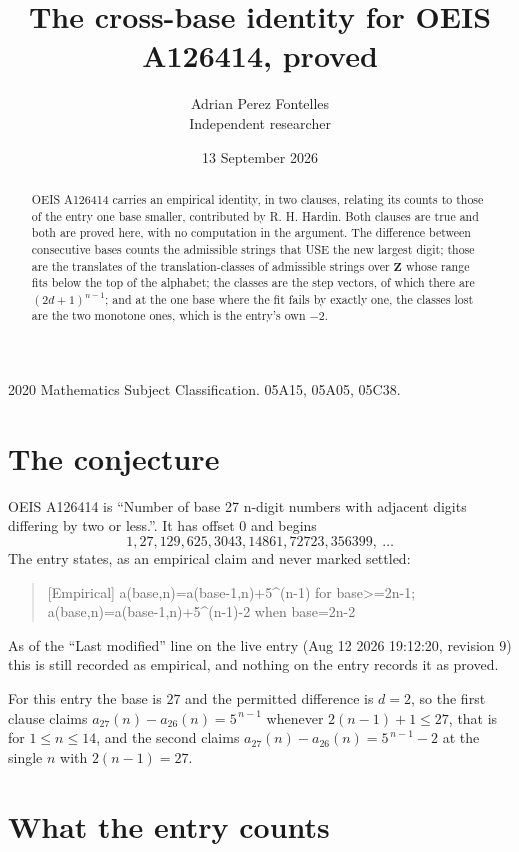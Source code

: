 \documentclass[11pt,a4paper]{article}
\title{The cross-base identity for OEIS A126414, proved}
\author{Adrian Perez Fontelles\\ \small Independent researcher}
\date{13 September 2026}
\theoremstyle{plain}
\theoremstyle{definition}
\begin{document}
\maketitle

\begin{abstract}
OEIS A126414 carries an empirical identity, in two clauses, relating its counts to those of the
entry one base smaller, contributed by R. H. Hardin. Both clauses are true and both are proved
here, with no computation in the argument. The difference between consecutive bases counts the
admissible strings that USE the new largest digit; those are the translates of the
translation-classes of admissible strings over $\mathbf{Z}$ whose range fits below the top of
the alphabet; the classes are the step vectors, of which there are $(2d+1)^{n-1}$; and at the
one base where the fit fails by exactly one, the classes lost are the two monotone ones, which
is the entry's own $-2$.
\end{abstract}

\noindent\small 2020 Mathematics Subject Classification. 05A15, 05A05, 05C38.\normalsize

\section{The conjecture}

OEIS A126414 is ``Number of base 27 n-digit numbers with adjacent digits differing by two or less.''. It has offset $0$ and begins
\[
1, 27, 129, 625, 3043, 14861, 72723, 356399,\ \dots
\]
The entry states, as an empirical claim and never marked settled:
\begin{quote}
[Empirical] a(base,n)=a(base-1,n)+5\textasciicircum{}(n-1) for base>=2n-1; a(base,n)=a(base-1,n)+5\textasciicircum{}(n-1)-2 when base=2n-2
\end{quote}
As of the ``Last modified'' line on the live entry (Aug 12 2026 19:12:20, revision 9)
this is still recorded as empirical, and nothing on the entry records it as proved.

For this entry the base is $27$ and the permitted difference is $d=2$, so the first clause
claims $a_{27}(n)-a_{26}(n)=5^{\,n-1}$ whenever $2(n-1)+1\le27$, that is for
$1\le n\le14$, and the second claims $a_{27}(n)-a_{26}(n)=5^{\,n-1}-2$ at the single
$n$ with $2(n-1)=27$.

\section{What the entry counts}
\end{document}
